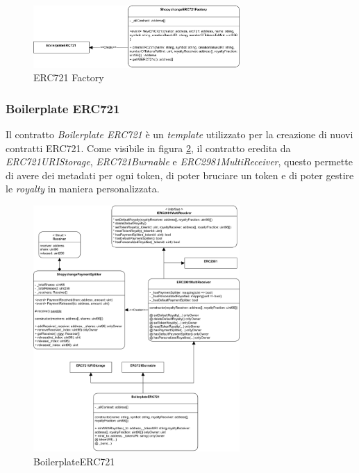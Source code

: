 \begin{figure}[H]
    \centering
    \includegraphics[width=0.7\textwidth]{images/blockchainContracts/ERC721Factory.png}
    \caption{ERC721 Factory}
    \label{fig:erc721Factory}
\end{figure}


\subsubsection{Boilerplate ERC721}

Il contratto \textit{Boilerplate ERC721} è un \textit{template} utilizzato per la creazione di nuovi contratti ERC721. Come visibile in figura \ref{fig:boilerplateERC721}, il contratto eredita da \textit{ERC721URIStorage}, \textit{ERC721Burnable} e \textit{ERC2981MultiReceiver}, questo permette di avere dei metadati per ogni token, di poter bruciare un token e di poter gestire le \textit{royalty} in maniera personalizzata.

\begin{figure}[H]
    \centering
    \includegraphics[width=0.7\textwidth]{images/blockchainContracts/BoilerplateERC721.png}
    \caption{BoilerplateERC721}
    \label{fig:boilerplateERC721}
\end{figure}

